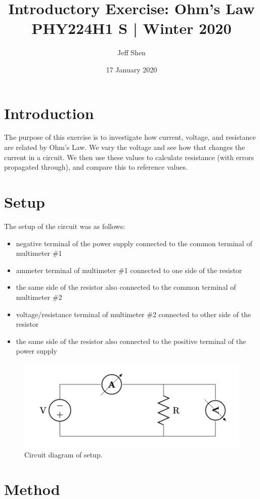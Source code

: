 \documentclass[11pt]{article}
\title{\vspace{-1cm}Introductory Exercise: Ohm's Law\\[0.4cm]\large{PHY224H1 S | Winter 2020}\vspace{-0.5em}}
\author{Jeff Shen}
\date{\vspace{-0.3em}\normalsize17 January 2020}
\begin{document}
\maketitle

\section{Introduction}

The purpose of this exercise is to investigate how current, voltage, and resistance are related by Ohm's Law. We vary the voltage and see how that changes the current in a circuit. We then use these values to calculate resistance (with errors propagated through), and compare this to reference values. 

\section{Setup}

The setup of the circuit was as follows:
\begin{itemize}
    \item negative terminal of the power supply connected to the common terminal  of multimeter \#1
    \item ammeter terminal of multimeter \#1 connected to one side of the resistor
    \item the same side of the resistor also connected to the common terminal of multimeter \#2
    \item voltage/resistance terminal of multimeter \#2 connected to other side of the resistor
    \item the same side of the resistor also connected to the positive terminal of the power supply
\end{itemize}

\begin{figure}[htb]
    \centering 
    \includegraphics[width=0.5\linewidth]{circuit.png}
    \caption{\label{fig:circuit}Circuit diagram of setup.}
\end{figure}

\section{Method}
\end{document}
